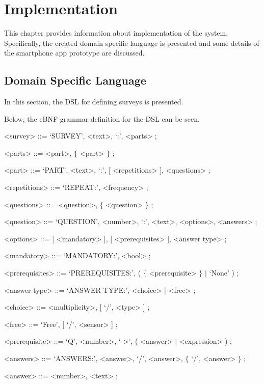 \chapter{Implementation}
\label{chap:implementation}
This chapter provides information about implementation of the system. Specifically, the created domain specific language is presented and some details of the smartphone app prototype are discussed.

\section{Domain Specific Language}
\label{sec:dsl}
In this section, the DSL for defining surveys is presented. 

Below, the eBNF grammar definition for the DSL can be seen.
\begin{grammar}
\label{grammar:ebnf}
      <survey> ::= `SURVEY', <text>, `:', <parts> ;
      
      <parts> ::= <part>, $\lbrace$ <part> $\rbrace$ ; 
       
      <part> ::= `PART', <text>, `:', {[} <repetitions> {]}, <questions> ;
      
      <repetitions> ::= `REPEAT:', <frequency> ;
      
      <questions> ::= <question>, $\lbrace$ <question> $\rbrace$ ;
      
      <question> ::= `QUESTION', <number>, `:', <text>, <options>, <answers> ;
      
      <options> ::= {[} <mandatory> {]}, {[} <prerequisites> {]}, <answer type> ;
      
      <mandatory> ::= `MANDATORY:', <bool> ;
      
      <prerequisites> ::= `PREREQUISITES:', ( $\lbrace$ <prerequisite> $\rbrace$ | `None' ) ;
      
      <answer type> ::= `ANSWER TYPE:', <choice> | <free> ;
      
      <choice> ::= <multiplicity>, {[} `/', <type> {]} ;
      
      <free> ::= `Free', {[} `/', <sensor> {]} ;
      
      <prerequisite> ::= `Q', <number>, `->', ( <answer> | <expression> ) ;
      
      <answers> ::= `ANSWERS:', <answer>, `/', <answer>, $\lbrace$ `/', <answer> $\rbrace$ ;
      
      <answer> ::= <number>, <text> ;
         

\end{grammar}
